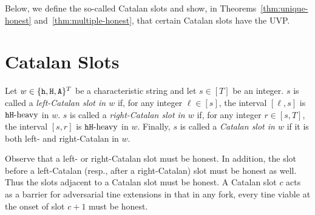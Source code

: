     




Below, we define the so-called Catalan slots and show, 
in Theorems~\ref{thm:unique-honest} and~\ref{thm:multiple-honest}, 
that certain Catalan slots have the UVP.

\section{Catalan Slots}\label{sec:catalan}

\begin{definition}
  Let $w \in \{\mathtt{h}, \mathtt{H}, \mathtt{A}\}^T$ be a characteristic string and 
  let $s \in [T]$ be an integer. 
  $s$ is called a \emph{left-Catalan slot in $w$} 
  if, for any integer $\ell \in [s]$, the interval $[\ell, s]$ is $\mathtt{h}\mathtt{H}\text{-heavy}$ in $w$.
  $s$ is called a \emph{right-Catalan slot in $w$} 
  if, for any integer $r \in [s, T]$, the interval $[s, r]$ is $\mathtt{h}\mathtt{H}\text{-heavy}$ in $w$.
  Finally, $s$ is called a \emph{Catalan slot in $w$} if 
  it is both left- and right-Catalan in $w$. 
\end{definition}
Observe that a left- or right-Catalan slot must be honest. 
In addition, the slot before a left-Catalan 
(resp., after a right-Catalan) slot must be honest as well.
Thus the slots adjacent to a Catalan slot must be honest. 
A Catalan slot $c$ acts as a barrier for adversarial tine extensions 
in that in any fork, every tine viable at the onset of slot $c+1$ must be honest. 



